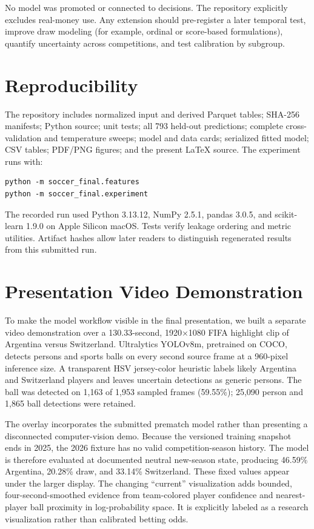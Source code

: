 \documentclass[10pt]{article}
\begin{document}
No model was promoted or connected to decisions. The repository explicitly excludes
real-money use. Any extension should pre-register a later temporal test, improve
draw modeling (for example, ordinal or score-based formulations), quantify uncertainty
across competitions, and test calibration by subgroup.

\section{Reproducibility}

The repository includes normalized input and derived Parquet tables; SHA-256
manifests; Python source; unit tests; all 793 held-out predictions; complete
cross-validation and temperature sweeps; model and data cards; serialized fitted
model; CSV tables; PDF/PNG figures; and the present \LaTeX{} source. The experiment
runs with:

\begin{verbatim}
python -m soccer_final.features
python -m soccer_final.experiment
\end{verbatim}

The recorded run used Python 3.13.12, NumPy 2.5.1, pandas 3.0.5, and scikit-learn
1.9.0 on Apple Silicon macOS. Tests verify leakage ordering and metric utilities.
Artifact hashes allow later readers to distinguish regenerated results from this
submitted run.

\section{Presentation Video Demonstration}

To make the model workflow visible in the final presentation, we built a separate
video demonstration over a 130.33-second, 1920$\times$1080 FIFA highlight clip of
Argentina versus Switzerland. Ultralytics YOLOv8m, pretrained on COCO, detects
persons and sports balls on every second source frame at a 960-pixel inference
size. A transparent HSV jersey-color heuristic labels likely Argentina and
Switzerland players and leaves uncertain detections as generic persons. The ball
was detected on 1,163 of 1,953 sampled frames (59.55\%); 25,090 person and 1,865
ball detections were retained.

The overlay incorporates the submitted prematch model rather than presenting a
disconnected computer-vision demo. Because the versioned training snapshot ends
in 2025, the 2026 fixture has no valid competition-season history. The model is
therefore evaluated at documented neutral new-season state, producing 46.59\%
Argentina, 20.28\% draw, and 33.14\% Switzerland. These fixed values appear under
the larger display. The changing ``current'' visualization adds bounded,
four-second-smoothed evidence from team-colored player confidence and nearest-player
ball proximity in log-probability space. It is explicitly labeled as a research
visualization rather than calibrated betting odds.
\end{document}
